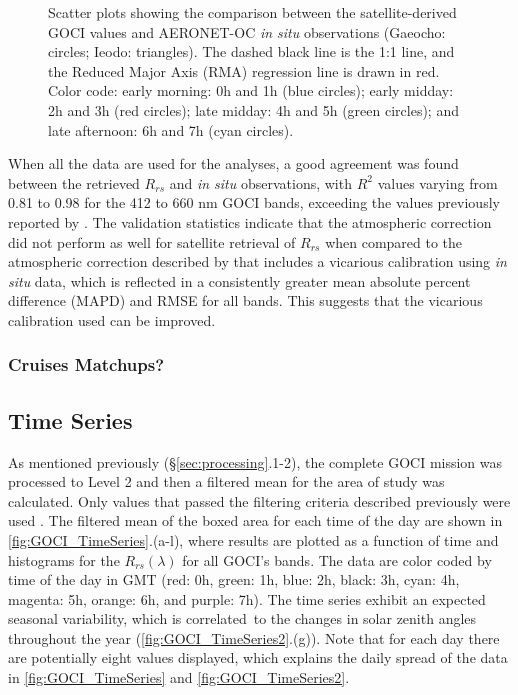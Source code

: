 \documentclass[onecolumn,3p,letterpaper,11pt]{elsarticle}
\begin{document}
\begin{figure}[H]
    \caption{Scatter plots showing the comparison between the satellite-derived GOCI values and AERONET-OC {\it in situ} observations (Gaeocho: circles; Ieodo: triangles). The dashed black line is the 1:1 line, and the Reduced Major Axis (RMA) regression line is drawn in red. Color code: early morning: 0h and 1h (blue circles); early midday: 2h and 3h (red circles); late midday: 4h and 5h (green circles); and late afternoon: 6h and 7h (cyan circles). \label{fig:GOCI_AERO} } 
\end{figure}

When all the data are used for the analyses, a good agreement was found between the retrieved $R_{rs}$ and {\it in situ} observations, with $R^2$ values varying from 0.81 to 0.98 for the 412 to 660 nm GOCI bands, exceeding the values previously reported by \citet{Ahn2015}. The validation statistics indicate that the atmospheric correction did not perform as well for satellite retrieval of $R_{rs}$ when compared to the atmospheric correction described by \citet{Ahn2015} that includes a vicarious calibration using {\it in situ} data, which is reflected in a consistently greater mean absolute percent difference (MAPD) and RMSE for all bands. This suggests that the vicarious calibration used can be improved. 
\subsubsection{Cruises Matchups?}
\subsection{Time Series}\label{subsec:timeseries}
As mentioned previously (\S\ref{sec:processing}.1-2), the complete GOCI mission was processed to Level 2 and then a filtered mean for the area of study was calculated. Only values that passed the filtering criteria described previously were used \citep{Bailey2006}. The filtered mean of the boxed area for each time of the day are shown in \autoref{fig:GOCI_TimeSeries}.(a-l), where results are plotted as a function of time and histograms for the $R_{rs}(\lambda)$ for all GOCI's bands. The data are color coded by time of the day in GMT (red: 0h, green: 1h, blue: 2h, black: 3h, cyan: 4h, magenta: 5h, orange: 6h, and purple: 7h). The time series exhibit an expected seasonal variability, which is correlated~to the changes in solar zenith angles throughout the year (\autoref{fig:GOCI_TimeSeries2}.(g)). Note that for each day there are potentially eight values displayed, which explains the daily spread of the data in \autoref{fig:GOCI_TimeSeries} and \autoref{fig:GOCI_TimeSeries2}. 
\end{document}
